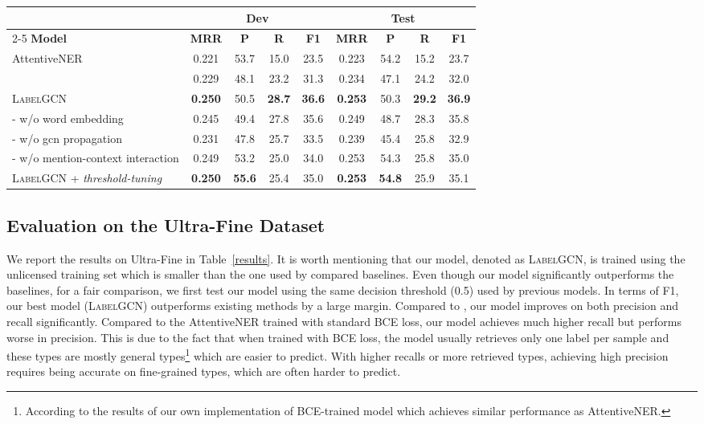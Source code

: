 \documentclass[11pt,a4paper]{article}
\begin{document}
\begin{table*}[t]
\centering
\small
\begin{tabular}{l|cccc|cccc}
\toprule
& \multicolumn{4}{c|}{\textbf{Dev}} & \multicolumn{4}{c}{\textbf{Test}}\\
\cmidrule{2-5}  \cmidrule{6-9} 
\textbf{Model} & \textbf{MRR} & \textbf{P} & \textbf{R} & \textbf{F1} & \textbf{MRR} & \textbf{P} & \textbf{R} & \textbf{F1}  \\ \midrule
AttentiveNER & 0.221 & 53.7 & 15.0 & 23.5 & 0.223 & 54.2 & 15.2 & 23.7 \\
\citet{choi2018ultra} & 0.229 & 48.1 & 23.2 & 31.3 & 0.234 & 47.1 & 24.2 & 32.0 \\ \midrule
\textsc{LabelGCN} & \textbf{0.250} & 50.5 & \textbf{28.7} & \textbf{36.6} & \textbf{0.253} & 50.3 & \textbf{29.2} & \textbf{36.9} \\ \multicolumn{1}{l|}{- w/o word embedding} & 0.245 & 49.4 & 27.8 & 35.6 & 0.249 & 48.7 & 28.3 & 35.8 \\
\multicolumn{1}{l|}{- w/o gcn propagation} & 0.231 & 47.8 & 25.7 & 33.5 & 0.239 & 45.4 & 25.8 & 32.9 \\ 
\multicolumn{1}{l|}{- w/o mention-context interaction} & 0.249 & 53.2 & 25.0 & 34.0 & 0.253 & 54.3 & 25.8 & 35.0 \\
\textsc{LabelGCN} + \emph{threshold-tuning} & \textbf{0.250} & \textbf{55.6} & 25.4 & 35.0 & \textbf{0.253} & \textbf{54.8} & 25.9 & 35.1\\
\bottomrule
\end{tabular}
\caption{Comparison with baseline models on the Ultra-Fine dataset. \emph{Threshold-tuning} gives better performance on all metrics compared to both baselines.}
\label{results}
\vspace{-0.2in}
\end{table*}

\subsection{Evaluation on the Ultra-Fine Dataset}
We report the results on Ultra-Fine in Table~\ref{results}. It is worth mentioning that our model, denoted as \textsc{LabelGCN}, is trained using the unlicensed training set which is smaller than the one used by compared baselines. Even though our model significantly outperforms the baselines, for a fair comparison, we first test our model using the same decision threshold (0.5) used by previous models. In terms of F1, our best model (\textsc{LabelGCN}) outperforms existing methods by a large margin. Compared to \citet{choi2018ultra}, our model improves on both precision and recall significantly. Compared to the AttentiveNER trained with standard BCE loss, our model achieves much higher recall but performs worse in precision. This is due to the fact that when trained with BCE loss, the model usually retrieves only one label per sample and these types are mostly general types\footnote{According to the results of our own implementation of BCE-trained model which achieves similar performance as AttentiveNER.} which are easier to predict. With higher recalls or more retrieved types, achieving high precision requires being accurate on fine-grained types, which are often harder to predict. 
\end{document}
